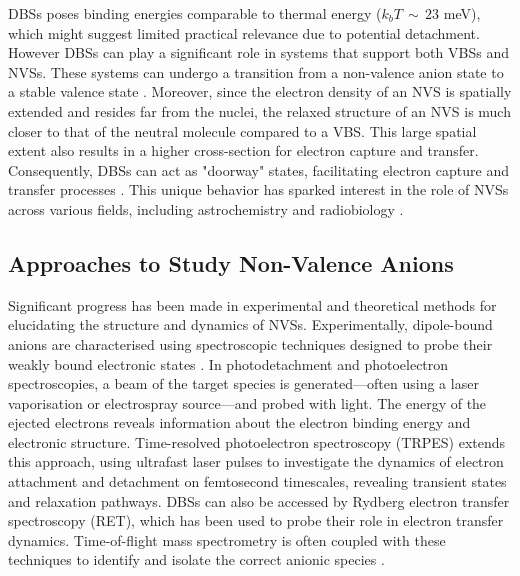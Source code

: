 DBSs poses binding energies comparable to thermal energy ($k_bT\,\sim\,23$ meV), which might suggest limited practical relevance due to potential detachment. However DBSs can play a significant role in systems that support both VBSs and NVSs. These systems can undergo a transition from a non-valence anion state to a stable valence state \cite{herbert2015quantum,jordan2003theory}. Moreover, since the electron density of an NVS is spatially extended and resides far from the nuclei, the relaxed structure of an NVS is much closer to that of the neutral molecule compared to a VBS. This large spatial extent also results in a higher cross-section for electron capture and transfer. Consequently, DBSs can act as "doorway" states, facilitating electron capture and transfer processes \cite{hendricks1998dipole,sommerfeld2002coupling,jordan2003theory,sommerfeld2004intramolecular,sommerfeld2005dipole,simons2008molecular,verlet2020role,kang2022state,hassan2022associative,simons2023molecular}. This unique behavior has sparked interest in the role of NVSs across various fields, including astrochemistry \cite{fortenberry2015interstellar} and radiobiology \cite{gu2012interactions,narayanan2023secondary,sedmidubska2024interaction}.

\subsection{Approaches to Study Non-Valence Anions}
Significant progress has been made in experimental and theoretical methods for elucidating the structure and dynamics of NVSs. \cite{desfranccois1995determination,simons2008molecular,simons2023molecular} Experimentally, dipole-bound anions are characterised using spectroscopic techniques designed to probe their weakly bound electronic states \cite{liu2020photoelectron,rogers2019photoelectron,clarke2024dynamics}. In photodetachment and photoelectron spectroscopies, a beam of the target species is generated—often using a laser vaporisation or electrospray source—and probed with light. The energy of the ejected electrons reveals information about the electron binding energy and electronic structure. Time-resolved photoelectron spectroscopy (TRPES)\cite{cyr1996femtosecond,neumark2001time} extends this approach, using ultrafast laser pulses to investigate the dynamics of electron attachment and detachment on femtosecond timescales, revealing transient states and relaxation pathways. DBSs can also be accessed by Rydberg electron transfer spectroscopy (RET)\cite{carles2001rydberg,eustis2007photoelectron,bradforth2002excited}, which has been used to probe their role in electron transfer dynamics. Time-of-flight mass spectrometry is often coupled with these techniques to identify and isolate the correct anionic species \cite{desfranccois1996abdoul,ameixa2023parent,pshenichnyuk2020ionizing}.

